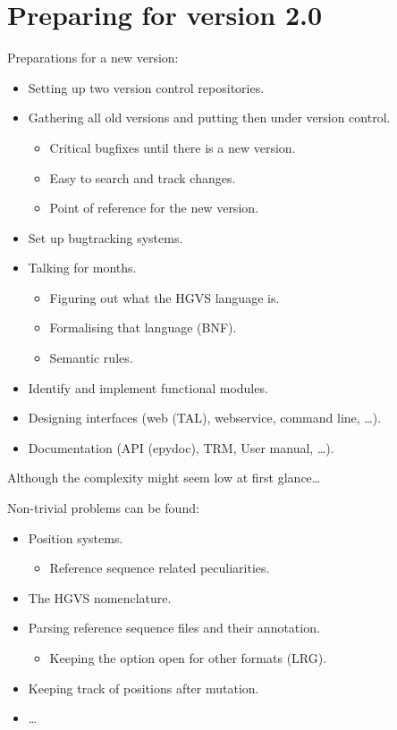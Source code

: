 \documentclass[slidestop]{beamer}
\begin{document}
\section{Preparing for version 2.0}
\begin{frame}
  Preparations for a new version:
  \begin{itemize}
    \item Setting up two version control repositories.
    \item Gathering all old versions and putting then under version control.
    \begin{itemize}
      \item Critical bugfixes until there is a new version.
      \item Easy to search and track changes.
      \item Point of reference for the new version.
    \end{itemize}
    \item Set up bugtracking systems.
    \pause
    \item Talking for months.
    \begin{itemize}
      \item Figuring out what the HGVS language is.
      \item Formalising that language (BNF).
      \item Semantic rules.
    \end{itemize}
    \item Identify and implement functional modules.
    \item Designing interfaces (web (TAL), webservice, command line, \ldots).
    \item Documentation (API (epydoc), TRM, User manual, \ldots).
  \end{itemize}
\end{frame}

\begin{frame}
  Although the complexity might seem low at first glance\ldots
  \bigskip
  
  Non-trivial problems can be found:
  \begin{itemize}
    \item Position systems.
    \begin{itemize}
      \item Reference sequence related peculiarities.
    \end{itemize}
    \item {}The HGVS nomenclature.
    \item Parsing reference sequence files and their annotation.
    \begin{itemize}
      \item Keeping the option open for other formats (LRG).
    \end{itemize}
    \item Keeping track of positions after mutation.
    \item \ldots
  \end{itemize}
\end{frame}
\end{document}
